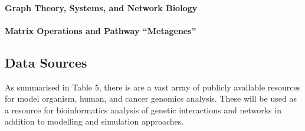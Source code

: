\paragraph{Graph Theory, Systems, and Network Biology}
\paragraph{Matrix Operations and Pathway ``Metagenes''}


\subsection[Data Sources]{Data Sources}

As summarised in Table 5, there is are a vast array of publicly available resources for model organism, human, and cancer genomics analysis. These will be used as a resource for bioinformatics analysis of genetic interactions and networks in addition to modelling and simulation approaches.  

